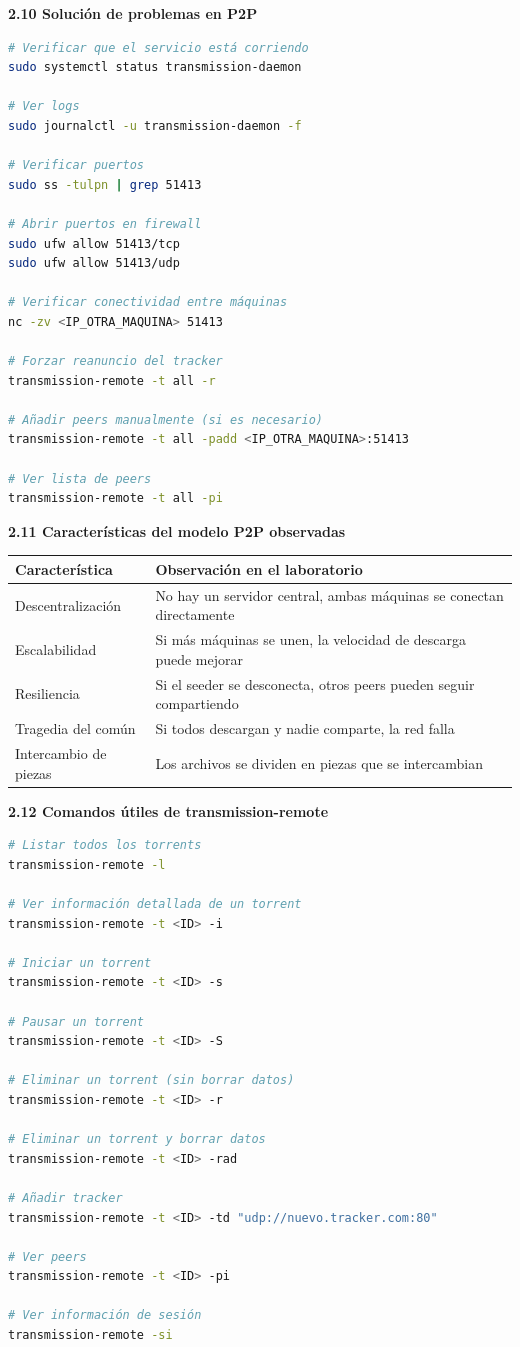\documentclass[12pt,a4paper]{report}
\begin{document}
\textbf{2.10 Solución de problemas en P2P}
\begin{lstlisting}[language=bash]
# Verificar que el servicio está corriendo
sudo systemctl status transmission-daemon

# Ver logs
sudo journalctl -u transmission-daemon -f

# Verificar puertos
sudo ss -tulpn | grep 51413

# Abrir puertos en firewall
sudo ufw allow 51413/tcp
sudo ufw allow 51413/udp

# Verificar conectividad entre máquinas
nc -zv <IP_OTRA_MAQUINA> 51413

# Forzar reanuncio del tracker
transmission-remote -t all -r

# Añadir peers manualmente (si es necesario)
transmission-remote -t all -padd <IP_OTRA_MAQUINA>:51413

# Ver lista de peers
transmission-remote -t all -pi
\end{lstlisting}

\textbf{2.11 Características del modelo P2P observadas}

\begin{table}[h]
\centering
\begin{tabular}{|p{4cm}|p{10cm}|}
\hline
\textbf{Característica} & \textbf{Observación en el laboratorio} \\ \hline
Descentralización & No hay un servidor central, ambas máquinas se conectan directamente \\ \hline
Escalabilidad & Si más máquinas se unen, la velocidad de descarga puede mejorar \\ \hline
Resiliencia & Si el seeder se desconecta, otros peers pueden seguir compartiendo \\ \hline
Tragedia del común & Si todos descargan y nadie comparte, la red falla \\ \hline
Intercambio de piezas & Los archivos se dividen en piezas que se intercambian \\ \hline
\end{tabular}
\end{table}

\textbf{2.12 Comandos útiles de transmission-remote}
\begin{lstlisting}[language=bash]
# Listar todos los torrents
transmission-remote -l

# Ver información detallada de un torrent
transmission-remote -t <ID> -i

# Iniciar un torrent
transmission-remote -t <ID> -s

# Pausar un torrent
transmission-remote -t <ID> -S

# Eliminar un torrent (sin borrar datos)
transmission-remote -t <ID> -r

# Eliminar un torrent y borrar datos
transmission-remote -t <ID> -rad

# Añadir tracker
transmission-remote -t <ID> -td "udp://nuevo.tracker.com:80"

# Ver peers
transmission-remote -t <ID> -pi

# Ver información de sesión
transmission-remote -si
\end{lstlisting}
\end{document}
